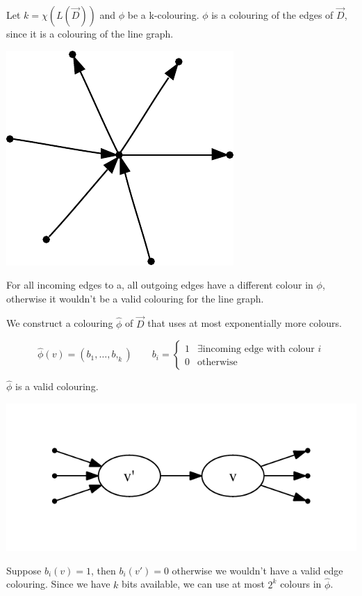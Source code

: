 \begin{pr} Let $k=\chi(L(\vec D))$ and $\phi$ be a k-colouring. $\phi$ is a colouring of the edges of $\vec D$, since it is a colouring of the line graph.

\begin{center}
\includegraphics{./images/edge_coloring_line_graph}
\end{center}

For all incoming edges to a, all outgoing edges have a different colour in $\phi$, otherwise it wouldn't be a valid colouring for the line graph.

We construct a colouring $\hat \phi$ of $\vec D$ that uses at most exponentially more colours. 

\[\hat \phi(v) = (b_1,\ldots,b,_k)\qquad b_i= \begin{cases} 1 & \exists \text{incoming edge with colour } i\\0 & \text{otherwise}\end{cases}\]

$\hat \phi$ is a valid colouring.

\begin{center}
\includegraphics{./images/coloring_from_edges}
\end{center}

Suppose $b_i(v)=1$, then $b_i(v')=0$ otherwise we wouldn't have a valid edge colouring. Since we have $k$ bits available, we can use at most $2^k$ colours in $\hat \phi$.
\end{pr}

